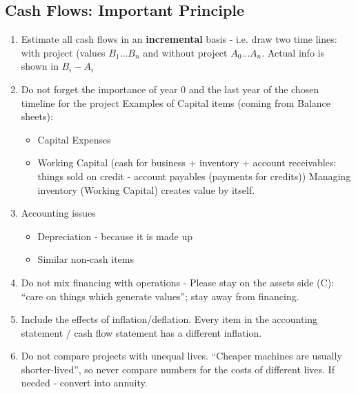 \documentclass{scrartcl}
\begin{document}
\subsection{Cash Flows: Important Principle}

\begin{enumerate}
\item Estimate all cash flows in an {\bf incremental} basis - i.e. draw two time
  lines: with project (values $B_1 \dots B_n$ and without project $A_0 \dots
  A_n$. Actual info is shown in $B_i - A_i$
\item Do not forget the importance of year 0 and the last year of the chosen
  timeline for the project Examples of Capital items (coming from Balance
  sheets): 
  \begin{itemize}
  \item Capital Expenses
  \item Working Capital (cash for business + inventory + account receivables:
    things sold on credit - account payables (payments for credits)) Managing
    inventory (Working Capital) creates value by itself.
  \end{itemize}
\item Accounting issues
  \begin{itemize}
  \item Depreciation - because it is made up
  \item Similar non-cash items
  \end{itemize}
\item Do not mix financing with operations
- Please stay on the assets side (C): ``care on things which generate values'';
stay away from financing.

\item Include the effects of inflation/deflation. Every item in the accounting
  statement / cash flow statement has a different inflation.
\item Do not compare projects with unequal lives. ``Cheaper machines are usually
  shorter-lived'', so never compare numbers for the costs of different lives. If
  needed - convert into annuity.
\end{enumerate}
\end{document}
